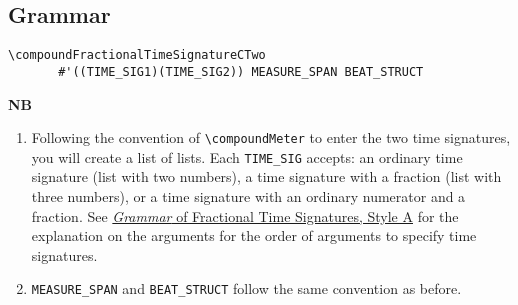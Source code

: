 \subsection{Grammar}
\begin{verbatim}
\compoundFractionalTimeSignatureCTwo 
       #'((TIME_SIG1)(TIME_SIG2)) MEASURE_SPAN BEAT_STRUCT
\end{verbatim}
\textbf{NB} 
\begin{enumerate}
\item Following the convention of \verb|\compoundMeter| to enter the two time signatures, you will create a list of lists. Each \verb|TIME_SIG| accepts: an ordinary time signature (list with two numbers), a time signature with a fraction (list with three numbers), or a time signature with an ordinary numerator and a fraction. See \hyperref[sec:time_signatures_styleA_convention]{\textit{Grammar} of Fractional Time Signatures, Style A} for the explanation on the arguments for the order of arguments to specify time signatures.
\item \verb|MEASURE_SPAN| and \verb|BEAT_STRUCT| follow the same convention as before.
\end{enumerate}
